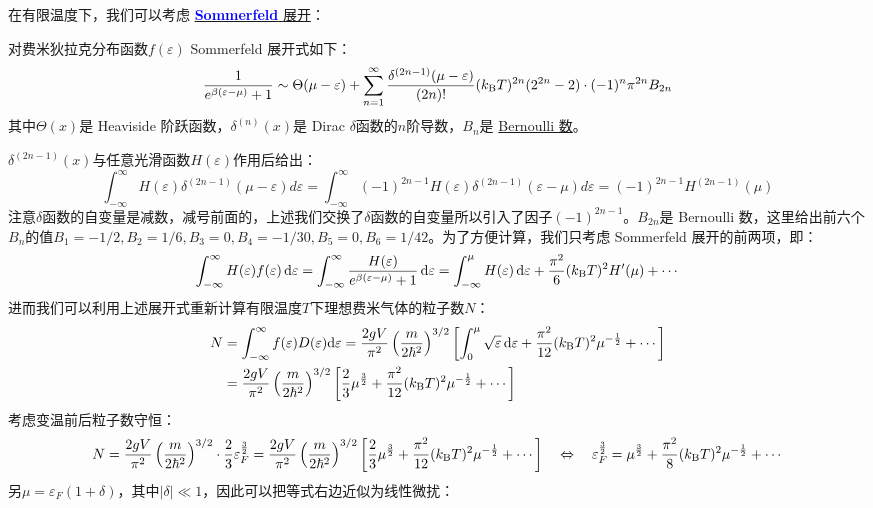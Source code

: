 在有限温度下，我们可以考虑 \href{http://staff.ustc.edu.cn/~weng/Teaching/SolidStatePhysics/SSP_Sommerfeld.pdf}{\textcolor{blue}{\textbf{Sommerfeld }}展开}：
\begin{theorem}[Sommerfeld 展开]
对费米狄拉克分布函数$f(\varepsilon)$ Sommerfeld 展开式如下：
\[\frac{1}{e^{\beta(\varepsilon-\mu)}+1}\sim\Theta(\mu-\varepsilon)+\sum_{n=1}^{\infty}\frac{\delta^{(2n-1)}(\mu-\varepsilon)}{(2n)!}(k_{\rm B}T)^{2n}(2^{2n}-2)\cdot(-1)^n\pi^{2n}B_{2n}\]
其中$\Theta(x)$是 Heaviside 阶跃函数，$\delta^{(n)}(x)$是 Dirac $\delta$函数的$n$阶导数，$B_n$是 \href{https://en.wikipedia.org/wiki/Bernoulli_number}{Bernoulli 数}。
\end{theorem}
$\delta^{(2n-1)}(x)$与任意光滑函数$H(\varepsilon)$作用后给出：
\[\int_{-\infty}^\infty H(\varepsilon)\delta^{(2n-1)}(\mu-\varepsilon)d\varepsilon=\int_{-\infty}^\infty (-1)^{2n-1}H(\varepsilon)\delta^{(2n-1)}(\varepsilon-\mu)d\varepsilon=(-1)^{2n-1}H^{(2n-1)}(\mu)\]
注意$\delta$函数的自变量是减数，减号前面的，上述我们交换了$\delta$函数的自变量所以引入了因子$(-1)^{2n-1}$。$B_{2n}$是 Bernoulli 数，这里给出前六个$B_n$的值$B_1=-1/2, B_2=1/6, B_3=0, B_4=-1/30, B_5=0, B_6=1/42$。为了方便计算，我们只考虑 Sommerfeld 展开的前两项，即：
\[\int_{-\infty}^{\infty} H(\varepsilon)f(\varepsilon)\dd{\varepsilon}=\int_{-\infty}^{\infty} \frac{H(\varepsilon)}{e^{\beta(\varepsilon-\mu)}+1}\dd{\varepsilon}=\int_{-\infty}^{\mu} H(\varepsilon)\dd{\varepsilon}+\frac{\pi^2}{6}(k_{\rm B}T)^2 H'(\mu)+\cdots\]
进而我们可以利用上述展开式重新计算有限温度$T$下理想费米气体的粒子数$N$：
\[\begin{aligned}
N&=\int_{-\infty}^{\infty} f(\varepsilon)D(\varepsilon)\dd\varepsilon
=\frac{2gV}{\pi^2}\left(\frac{m}{2\hbar^2}\right)^{3/2}\left[\int_0^{\mu}\sqrt{\varepsilon}\dd{\varepsilon}+\frac{\pi^2}{12}(k_{\rm B}T)^2\mu^{-\frac{1}{2}}+\cdots\right]\\
&=\frac{2gV}{\pi^2}\left(\frac{m}{2\hbar^2}\right)^{3/2}\left[\frac{2}{3}\mu^{\frac{3}{2}}+\frac{\pi^2}{12}(k_{\rm B}T)^2\mu^{-\frac{1}{2}}+\cdots\right]\\
\end{aligned}\]
考虑变温前后粒子数守恒：
\[N=\frac{2gV}{\pi^2}\left(\frac{m}{2\hbar^2}\right)^{3/2}\cdot\frac{2}{3}\varepsilon_F^{\frac{3}{2}}=\frac{2gV}{\pi^2}\left(\frac{m}{2\hbar^2}\right)^{3/2}\left[\frac{2}{3}\mu^{\frac{3}{2}}+\frac{\pi^2}{12}(k_{\rm B}T)^2\mu^{-\frac{1}{2}}+\cdots\right] \quad \Leftrightarrow \quad \varepsilon_F^{\frac{3}{2}}=\mu^{\frac{3}{2}}+\frac{\pi^2}{8}(k_{\rm B}T)^2\mu^{-\frac{1}{2}}+\cdots\]
另$\mu=\varepsilon_F(1+\delta)$，其中$|\delta|\ll 1$，因此可以把等式右边近似为线性微扰：
